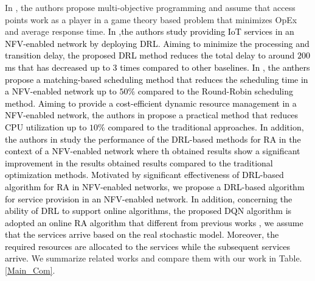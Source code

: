 \documentclass[20pt,twocolumn]{IEEEtran}
\begin{document}
 In \cite{wu2019resource}, the authors  propose multi-objective programming and assume that access points  work as a player in a game theory based problem that minimizes OpEx and average response time.
 \textcolor{black}{In \cite{fu2019dynamic},the authors study providing IoT services in an NFV-enabled network by deploying DRL. Aiming to minimize the processing and transition delay, the proposed DRL method reduces the total delay to around $200$ms that  has decreased up to 3 times compared to other baselines. In \cite{pham2017virtual}, the anthers propose a matching-based scheduling method  that reduces the scheduling time in a NFV-enabled network up to $50\%$  compared to the Round-Robin scheduling method. Aiming to provide a cost-efficient dynamic resource management in a NFV-enabled network, the authors in \cite{li2020finedge} propose a practical method that reduces CPU utilization up to $10\%$  compared to the traditional approaches. In addition, the authors in \cite{ning2020deep, pei2019optimal, qu2020dynamic} study the performance of the DRL-based methods for   RA in the context of a NFV-enabled network where th obtained results show a significant improvement in the results obtained results  compared to the traditional optimization methods. Motivated by significant effectiveness of DRL-based algorithm for RA in NFV-enabled networks, we propose a DRL-based algorithm for service provision in an NFV-enabled network. In addition, concerning the ability of DRL to support online algorithms, the proposed DQN algorithm is adopted an online RA algorithm that  different from previous works \cite{jia2018online,huang2019maximizing,xu2018throughput}, we assume that the services arrive based on the real stochastic model. Moreover, the required resources are allocated to the services while the subsequent services arrive.}
We summarize  related works and compare them with our work in Table. \ref{Main_Com}.  
\end{document}
